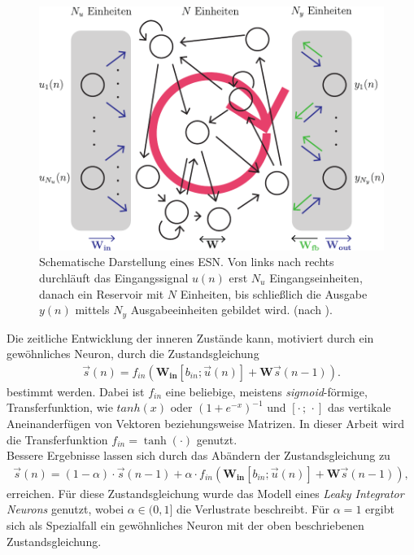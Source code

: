 \begin{figure}[h]
    \centering
    \includegraphics[width = 0.7 \textwidth]{figures/illustrations/esn_structure.pdf}
    \caption{Schematische Darstellung eines \textsc{ESN}. Von links nach rechts durchläuft das Eingangssignal $u(n)$ erst $N_u$ Eingangseinheiten, danach ein Reservoir mit $N$ Einheiten, bis schließlich die Ausgabe $y(n)$ mittels $N_y$ Ausgabeeinheiten gebildet wird. (nach \citep{jeagerTut2002, Ma2013}).}
    \label{fig:esn_structure}
\end{figure}


Die zeitliche Entwicklung der inneren Zustände kann, motiviert durch ein gewöhnliches Neuron, durch die Zustandsgleichung
\begin{align}
\vec{s}(n) = f_{in}\left( \mathbf{W_{in}} [b_{in}; \vec{u}(n)] + \mathbf{W} \vec{s}(n-1) \right).
\end{align}
bestimmt werden. Dabei ist $f_{in}$ eine beliebige, meistens \textit{sigmoid}-förmige, Transferfunktion, wie $tanh(x)$ oder $(1+e^{-x})^{-1}$ und $[\cdot\,;\,\cdot]$ das vertikale Aneinanderfügen von Vektoren beziehungsweise Matrizen. In dieser Arbeit wird die Transferfunktion $f_{in} = \tanh(\cdot)$ genutzt.\\

Bessere Ergebnisse lassen sich durch das Abändern der Zustandsgleichung zu
\begin{align}
\label{eq:esn_stateeq}
\vec{s}(n) = (1 - \alpha) \cdot \vec{s}(n-1)  + \alpha \cdot f_{in}\left( \mathbf{W_{in}} [b_{in}; \vec{u}(n)] + \mathbf{W} \vec{s}(n-1) \right),
\end{align}
erreichen. Für diese Zustandsgleichung wurde das Modell eines \textit{Leaky Integrator Neurons} genutzt, wobei $\alpha \in (0,1]$ die Verlustrate beschreibt. Für $\alpha=1$ ergibt sich als Spezialfall ein gewöhnliches Neuron mit der oben beschriebenen Zustandsgleichung.\\

